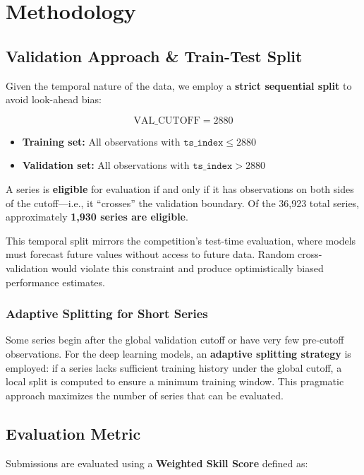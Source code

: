 \section{Methodology}
\label{sec:methodology}

\subsection{Validation Approach \& Train-Test Split}
\label{sec:validation}

Given the temporal nature of the data, we employ a \textbf{strict sequential split} to avoid look-ahead bias:

\begin{equation}
\text{VAL\_CUTOFF} = 2880
\end{equation}

\begin{itemize}
    \item \textbf{Training set:} All observations with $\texttt{ts\_index} \leq 2880$
    \item \textbf{Validation set:} All observations with $\texttt{ts\_index} > 2880$
\end{itemize}

A series is \textbf{eligible} for evaluation if and only if it has observations on both sides of the cutoff---i.e., it ``crosses'' the validation boundary. Of the 36,923 total series, approximately \textbf{1,930 series are eligible}.

This temporal split mirrors the competition's test-time evaluation, where models must forecast future values without access to future data. Random cross-validation would violate this constraint and produce optimistically biased performance estimates.

\subsubsection{Adaptive Splitting for Short Series}

Some series begin after the global validation cutoff or have very few pre-cutoff observations. For the deep learning models, an \textbf{adaptive splitting strategy} is employed: if a series lacks sufficient training history under the global cutoff, a local split is computed to ensure a minimum training window. This pragmatic approach maximizes the number of series that can be evaluated.

\subsection{Evaluation Metric}
Submissions are evaluated using a \textbf{Weighted Skill Score} defined as:

